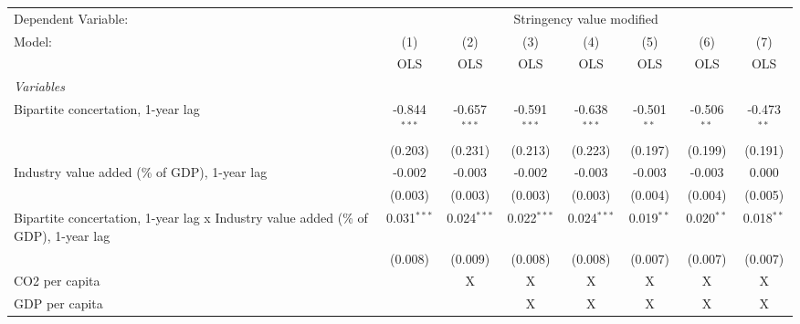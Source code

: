 
\begingroup
\centering
\begin{tabular}{lccccccc}
   \toprule
   Dependent Variable: & \multicolumn{7}{c}{Stringency value modified}\\
   Model:                                                                             & (1)            & (2)            & (3)            & (4)            & (5)           & (6)           & (7)\\  
                                                                                      &  OLS           & OLS            & OLS            & OLS            & OLS           & OLS           & OLS\\  
   \midrule
   \emph{Variables}\\
   Bipartite concertation, 1-year lag                                                 & -0.844$^{***}$ & -0.657$^{***}$ & -0.591$^{***}$ & -0.638$^{***}$ & -0.501$^{**}$ & -0.506$^{**}$ & -0.473$^{**}$\\   
                                                                                      & (0.203)        & (0.231)        & (0.213)        & (0.223)        & (0.197)       & (0.199)       & (0.191)\\   
   Industry value added (\% of GDP), 1-year lag                                       & -0.002         & -0.003         & -0.002         & -0.003         & -0.003        & -0.003        & 0.000\\   
                                                                                      & (0.003)        & (0.003)        & (0.003)        & (0.003)        & (0.004)       & (0.004)       & (0.005)\\   
   Bipartite concertation, 1-year lag x Industry value added (\% of GDP), 1-year lag  & 0.031$^{***}$  & 0.024$^{***}$  & 0.022$^{***}$  & 0.024$^{***}$  & 0.019$^{**}$  & 0.020$^{**}$  & 0.018$^{**}$\\   
                                                                                      & (0.008)        & (0.009)        & (0.008)        & (0.008)        & (0.007)       & (0.007)       & (0.007)\\   
   CO2 per capita                                                                     &                & X              & X              & X              & X             & X             & X\\  
   GDP per capita                                                                     &                &                & X              & X              & X             & X             & X\\  

\end{tabular}
